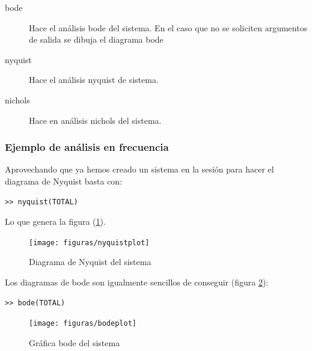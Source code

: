 \begin{description}
\item [bode]Hace el análisis bode del sistema. En el caso
que no se soliciten argumentos de salida se dibuja el diagrama bode 
\item [nyquist]Hace el análisis nyquist de sistema. 
\item [nichols]Hace en análisis nichols del sistema. 
\end{description}

\subsubsection{Ejemplo de análisis en frecuencia}

\label{sec:ejercicioanalisis} Aprovechando que ya hemos creado un
sistema en la sesión para hacer el diagrama de Nyquist basta con:
\begin{verbatim}
>> nyquist(TOTAL)
\end{verbatim} Lo que genera la figura (\ref{fig:nyquist}). %
\begin{figure}
 \centering
    \texttt{[image: figuras/nyquistplot]}


\caption{\label{fig:nyquist}Diagrama de Nyquist del sistema}
\end{figure}


Los diagramas de bode son igualmente sencillos de conseguir (figura
\ref{cap:bode}): 
\begin{verbatim}
>> bode(TOTAL)
\end{verbatim}%
\begin{figure}
 \centering
    \texttt{[image: figuras/bodeplot]}

\caption{\label{cap:bode}Gráfica bode del sistema}
\end{figure}

